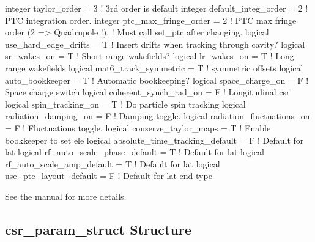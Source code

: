 {{{{{{{{\begin{example}
    integer taylor_order = 3               ! 3rd order is default
    integer default_integ_order = 2        ! PTC integration order.
    integer ptc_max_fringe_order = 2       ! PTC max fringe order (2 => Quadrupole !).
                                           !   Must call set_ptc after changing.
    logical use_hard_edge_drifts = T       ! Insert drifts when tracking through cavity?
    logical sr_wakes_on = T                ! Short range wakefields?
    logical lr_wakes_on = T                ! Long range wakefields
    logical mat6_track_symmetric = T       ! symmetric offsets
    logical auto_bookkeeper = T            ! Automatic bookkeeping?
    logical space_charge_on = F            ! Space charge switch
    logical coherent_synch_rad_on = F      ! Longitudinal csr 
    logical spin_tracking_on = T           ! Do particle spin tracking
    logical radiation_damping_on = F       ! Damping toggle.
    logical radiation_fluctuations_on = F  ! Fluctuations toggle.
    logical conserve_taylor_maps = T       ! Enable bookkeeper to set ele%
    logical absolute_time_tracking_default = F  ! Default for lat%
    logical rf_auto_scale_phase_default = T     ! Default for lat%
    logical rf_auto_scale_amp_default = T       ! Default for lat%
    logical use_ptc_layout_default = F          ! Default for lat%
  end type
\end{example}
See the \bmad manual for more details.

\subsection{csr\_param\_struct Structure}
\label{s:csr.param.struct} 

}}}}}}}}
